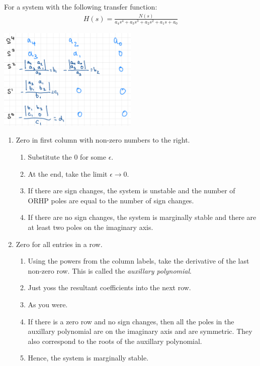 \documentclass{article}
\begin{document}
For a system with the following transfer function:
\begin{align*}
  H(s) = \frac{N(s)}{a_4s^4 + a_3s^3 + a_2s^2 + a_1s + a_0}
\end{align*}
\begin{center}
  \includegraphics[width=0.5\textwidth]{images/routh_hurwitz.png}
\end{center}


\begin{enumerate}
\item Zero in first column with non-zero numbers to the right.
  \begin{enumerate}
  \item Substitute the 0 for some $\epsilon$.
  \item At the end, take the limit $\epsilon \to 0$.
  \item If there are sign changes, the system is unstable and the number of ORHP poles are equal to the number of sign changes.
  \item If there are no sign changes, the system is marginally stable and there are at least two poles on the imaginary axis.
  \end{enumerate}
\item Zero for all entries in a row.
  \begin{enumerate}
  \item Using the powers from the column labels, take the derivative of the last non-zero row. This is called the \textit{auxillary polynomial}.
  \item Just yoss the resultant coefficients into the next row.
  \item As you were.
  \item If there is a zero row and no sign changes, then all the poles in the auxillary polynomial are on the imaginary axis and are symmetric. They also correspond to the roots of the auxillary polynomial.
  \item Hence, the system is marginally stable.
  \end{enumerate}
\end{enumerate}
\end{document}
